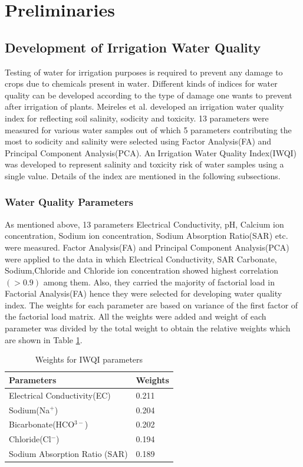 \section{Preliminaries}
\label{section:preliminaries}

\subsection{Development of Irrigation Water Quality}
\label{subsection:devIWQI}
Testing of water for irrigation purposes is required to prevent any damage to crops due to chemicals present in water. Different kinds of indices for water quality can be developed according to the type of damage one wants to prevent after irrigation of plants. Meireles et al. developed an irrigation water quality index for reflecting soil salinity, sodicity and toxicity. 13 parameters were measured for various water samples out of which 5 parameters contributing the most to sodicity and salinity were selected using Factor Analysis(FA) and Principal Component Analysis(PCA). An Irrigation Water Quality Index(IWQI) was developed to represent salinity and toxicity risk of water samples using a single value. Details of the index are mentioned in the following subsections. 

\subsubsection{Water Quality Parameters}
\label{subsubsection:WaterQualityParameters}
As mentioned above, 13 parameters Electrical Conductivity, pH, Calcium ion concentration, Sodium ion concentration, Sodium Absorption Ratio(SAR) etc. were measured. Factor Analysis(FA) and Principal Component Analysis(PCA) were applied to the data in which Electrical Conductivity, SAR Carbonate, Sodium,Chloride and Chloride ion concentration showed highest correlation$(>0.9)$ among them. Also, they carried the majority of factorial load in Factorial Analysis(FA) hence they were selected for developing water quality index. The weights for each parameter are based on variance of the first factor of the factorial load matrix. All the weights were added and weight of each parameter was divided by the total weight to obtain the relative weights which are shown in Table \ref{table:wqiParams}. 

\begin{table}[h!]
    \centering
    \begin{tabular}{|l|l|}
    \hline
        \textbf{Parameters} & \textbf{Weights} \\ \hline
        Electrical Conductivity(EC) & 0.211 \\ \hline
        Sodium(Na$^+$) & 0.204 \\ \hline
        Bicarbonate(HCO$^{3-}$) & 0.202 \\ \hline
        Chloride(Cl$^-$) & 0.194 \\ \hline
        Sodium Absorption Ratio (SAR) & 0.189 \\ \hline
    \end{tabular}
    \caption{Weights for IWQI parameters}
    \label{table:wqiParams}
\end{table}

